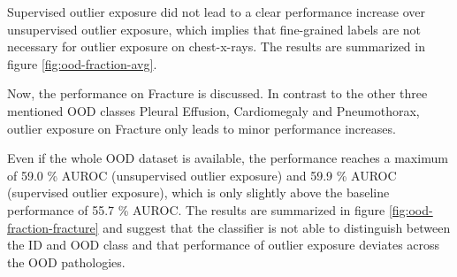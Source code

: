 \par
Supervised outlier exposure did not lead to a clear performance increase over unsupervised outlier exposure, which implies that fine-grained labels are not necessary for outlier exposure on chest-x-rays.
The results are summarized in figure \ref{fig:ood-fraction-avg}.
\par
Now, the performance on Fracture is discussed.
In contrast to the other three mentioned OOD classes Pleural Effusion, Cardiomegaly and Pneumothorax, outlier exposure on Fracture only leads to minor performance increases.
\par
Even if the whole OOD dataset is available, the performance reaches a maximum of 59.0 \% AUROC (unsupervised outlier exposure) and 59.9 \% AUROC (supervised outlier exposure), which is only slightly above the baseline performance of 55.7 \% AUROC.
The results are summarized in figure \ref{fig:ood-fraction-fracture} and suggest that the classifier is not able to distinguish between the ID and OOD class and that performance of outlier exposure deviates across the OOD pathologies.  